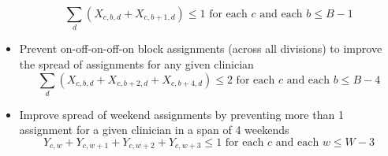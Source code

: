 \documentclass[]{article}
\begin{document}
\begin{itemize}
			\begin{equation}
				\sum_d \left(X_{c, b, d} + X_{c, b+1, d}\right) \leq 1 \text{ for each $c$ and each $b \leq B - 1$}
			\end{equation}
		\item Prevent on-off-on-off-on block assignments (across all divisions) to improve the spread of assignments for any given clinician
			\begin{equation}
				\sum_d \left(X_{c, b, d} + X_{c, b + 2, d} + X_{c, b + 4, d}\right) \leq 2 \text{ for each $c$ and each $b \leq B - 4$}
			\end{equation}
		\item Improve spread of weekend assignments by preventing more than 1 assignment for a given clinician in a span of 4 weekends
			\begin{equation}
				Y_{c, w} + Y_{c, w+1} + Y_{c, w+2} + Y_{c, w+3} \leq 1 \text{ for each $c$ and each $w \leq W - 3$}
			\end{equation}
	\end{itemize}
\end{document}
